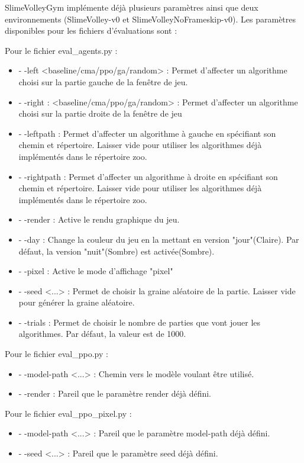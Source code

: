 \documentclass[11pt, a4paper]{article}
\begin{document}
SlimeVolleyGym implémente déjà plusieurs paramètres ainsi que deux environnements (SlimeVolley-v0 et SlimeVolleyNoFrameskip-v0). Les paramètres disponibles pour les fichiers d'évaluations sont : 

Pour le fichier eval\_agents.py :
\begin{itemize}
\item - -left <baseline/cma/ppo/ga/random> : Permet d'affecter un algorithme choisi sur la partie gauche de la fenêtre de jeu.
\item - -right : <baseline/cma/ppo/ga/random> : Permet d'affecter un algorithme choisi sur la partie droite de la fenêtre de jeu
\item - -leftpath : Permet d'affecter un algorithme à gauche en spécifiant son chemin et répertoire. Laisser vide pour utiliser les algorithmes déjà implémentés dans le répertoire zoo.
\item - -rightpath : Permet d'affecter un algorithme à droite en spécifiant son chemin et répertoire. Laisser vide pour utiliser les algorithmes déjà implémentés dans le répertoire zoo.
\item - -render : Active le rendu graphique du jeu.
\item - -day : Change la couleur du jeu en la mettant en version "jour"(Claire). Par défaut, la version "nuit"(Sombre) est activée(Sombre). 
\item - -pixel : Active le mode d'affichage "pixel"
\item - -seed <...> : Permet de choisir la graine aléatoire de la partie. Laisser vide pour générer la graine aléatoire.
\item - -trials : Permet de choisir le nombre de parties que vont jouer les algorithmes. Par défaut, la valeur est de 1000.
\end{itemize}

Pour le fichier eval\_ppo.py :
\begin{itemize}
\item - -model-path <...> : Chemin vers le modèle voulant être utilisé. 
\item - -render : Pareil que le paramètre render déjà défini.
\end{itemize}

Pour le fichier eval\_ppo\_pixel.py :
\begin{itemize}
\item - -model-path <...> : Pareil que le paramètre model-path déjà défini.
\item - -seed <...> : Pareil que le paramètre seed déjà défini.
\end{itemize}
\end{document}
